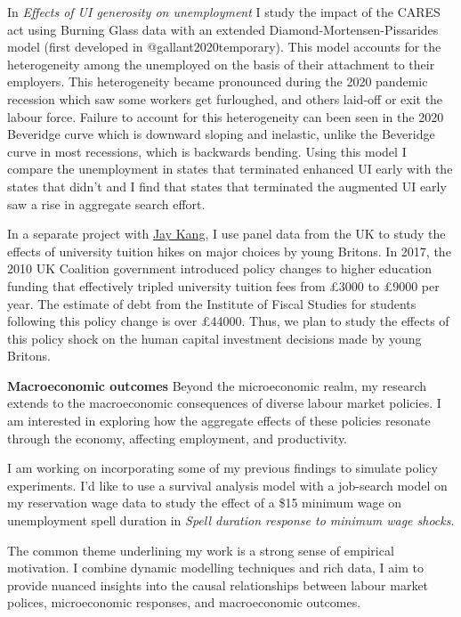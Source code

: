\documentclass[
]{article}
\begin{document}
In \emph{Effects of UI generosity on unemployment} I study the impact of
the CARES act using Burning Glass data with an extended
Diamond-Mortensen-Pissarides model (first developed in
@gallant2020temporary). This model accounts for the heterogeneity among
the unemployed on the basis of their attachment to their employers. This
heterogeneity became pronounced during the 2020 pandemic recession which
saw some workers get furloughed, and others laid-off or exit the labour
force. Failure to account for this heterogeneity can been seen in the
2020 Beveridge curve which is downward sloping and inelastic, unlike the
Beveridge curve in most recessions, which is backwards bending. Using
this model I compare the unemployment in states that terminated enhanced
UI early with the states that didn't and I find that states that
terminated the augmented UI early saw a rise in aggregate search effort.

In a separate project with \href{https://www.hyunjaekang.com/}{Jay
Kang}, I use panel data from the UK to study the effects of university
tuition hikes on major choices by young Britons. In 2017, the 2010 UK
Coalition government introduced policy changes to higher education
funding that effectively tripled university tuition fees from £3000 to
£9000 per year. The estimate of debt from the Institute of Fiscal
Studies for students following this policy change is over £44000. Thus,
we plan to study the effects of this policy shock on the human capital
investment decisions made by young Britons.

\textbf{Macroeconomic outcomes} Beyond the microeconomic realm, my
research extends to the macroeconomic consequences of diverse labour
market policies. I am interested in exploring how the aggregate effects
of these policies resonate through the economy, affecting employment,
and productivity.

I am working on incorporating some of my previous findings to simulate
policy experiments. I'd like to use a survival analysis model with a
job-search model on my reservation wage data to study the effect of a
\$15 minimum wage on unemployment spell duration in \emph{Spell duration
response to minimum wage shocks}.

The common theme underlining my work is a strong sense of empirical
motivation. I combine dynamic modelling techniques and rich data, I aim
to provide nuanced insights into the causal relationships between labour
market polices, microeconomic responses, and macroeconomic outcomes.
\end{document}
